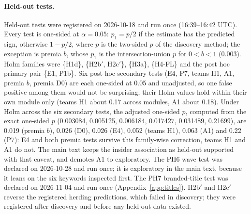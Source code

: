 \paragraph{Held-out tests.} Held-out tests were registered on 2026-10-18 and run once (16:39--16:42 UTC). Every test
is one-sided at $\alpha = 0.05$: $p_1 = p/2$ if the estimate has the predicted sign, otherwise $1-p/2$, where $p$ is
the two-sided $p$ of the discovery method; the exception is premia $b$, whose $p_1$ is the intersection-union $p$
for $0<b<1$ (0.003). Holm families were \{H1d\}, \{H2b$'$, H2c$'$\}, \{H3a\}, \{H4-FL\} and the
post hoc primary pair \{E1, P1b\}. Six post hoc secondary tests (E4, P7, teams H1, A1, premia $b$, premia D0) are each
one-sided at 0.05 and unadjusted, so one false positive among them would not be surprising; their Holm values hold
within their own module only (teams H1 about 0.17 across modules, A1 about 0.18). Under Holm across the six
secondary tests, the adjusted one-sided $p$, computed from the exact one-sided $p$ (0.003084, 0.005125, 0.006184, 0.017427,
0.031489, 0.21699), are 0.019 (premia $b$), 0.026 (D0), 0.026 (E4), 0.052 (teams H1), 0.063 (A1) and 0.22 (P7): E4 and both premia tests survive this family-wise correction, teams H1 and A1 do not. The main
text keeps the insider association as held-out supported with that caveat, and demotes A1 to exploratory. The PH6
wave test was declared on 2026-10-28 and run once; it is exploratory in the main text, because it leans on the six
keywords inspected first. The PH7 branded-title test was declared on 2026-11-04 and run once
(Appendix~\ref{app:titles}). H2b$'$ and H2c$'$ reverse the registered herding predictions, which failed in discovery;
they were registered after discovery and before any held-out data existed.


